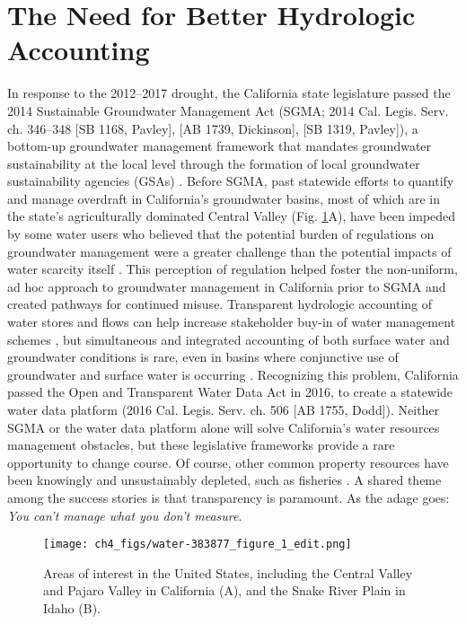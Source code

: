 
\section{The Need for Better Hydrologic Accounting}

In response to the 2012–2017 drought, the California state legislature passed the 2014 Sustainable Groundwater Management Act (SGMA; 2014 Cal. Legis. Serv. ch. 346–348 [SB 1168, Pavley], [AB 1739, Dickinson], [SB 1319, Pavley]), a bottom-up groundwater management framework \citep{smith_critical_2008} that mandates groundwater sustainability at the local level through the formation of local groundwater sustainability agencies (GSAs) \citep{kiparsky_unanswered_2016,conrad_consolidate_2016}. Before SGMA, past statewide efforts to quantify and manage overdraft in California’s groundwater basins, most of which are in the state’s agriculturally dominated Central Valley (Fig. \ref{fig:site_overview}A), have been impeded by some water users who believed that the potential burden of regulations on groundwater management were a greater challenge than the potential impacts of water scarcity itself \citep{niles_farmers_2017}. This perception of regulation helped foster the non-uniform, ad hoc approach to groundwater management in California prior to SGMA \citep{nelson_assessing_2012} and created pathways for continued misuse. Transparent hydrologic accounting of water stores and flows can help increase stakeholder buy-in of water management schemes \citep{escriva-bou_accounting_2016}, but simultaneous and integrated accounting of both surface water and groundwater conditions is rare, even in basins where conjunctive use of groundwater and surface water is occurring \citep{goharian_maximizing_2018,cantor_navigating_2018}. Recognizing this problem, California passed the Open and Transparent Water Data Act in 2016, to create a statewide water data platform (2016 Cal. Legis. Serv. ch. 506 [AB 1755, Dodd]). Neither SGMA or the water data platform alone will solve California’s water resources management obstacles, but these legislative frameworks provide a rare opportunity to change course. Of course, other common property resources have been knowingly and unsustainably depleted, such as fisheries \citep{mora_management_2009}. A shared theme among the success stories is that transparency is paramount. As the adage goes: \textit{You can’t manage what you don’t measure}.

\begin{figure}[ht!]
\centering
\texttt{[image: ch4\_figs/water-383877\_figure\_1\_edit.png]}
\caption{Areas of interest in the United States, including the Central Valley and Pajaro Valley in California (A), and the Snake River Plain in Idaho (B).}
\label{fig:site_overview}
\end{figure}

